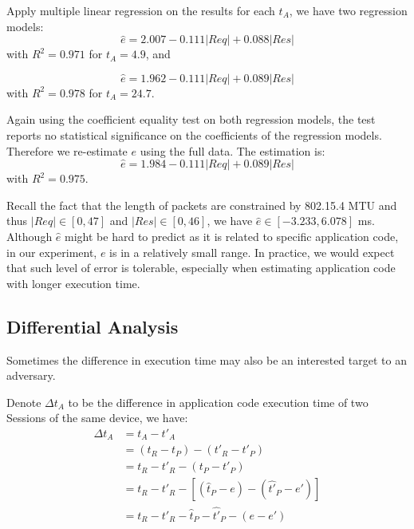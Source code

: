 Apply multiple linear regression on the results for each $t_A$, we have two regression models:
\begin{equation}
	\hat{e} = 2.007 - 0.111|Req| + 0.088|Res|
\end{equation}
with $R^2 = 0.971$ for $t_A = 4.9$, and

\begin{equation}
	\hat{e} = 1.962 - 0.111|Req| + 0.089|Res|
\end{equation}
with $R^2 = 0.978$ for $t_A = 24.7$.

Again using the coefficient equality test on both regression models, the test reports no statistical significance on the coefficients of the regression models. Therefore we re-estimate $e$ using the full data. The estimation is:
\begin{equation} \label{hate}
	\hat{e} = 1.984 - 0.111|Req| + 0.089|Res|
\end{equation}
with $R^2 = 0.975$.

Recall the fact that the length of packets are constrained by 802.15.4 MTU and thus $|Req| \in [0,47]$ and $|Res| \in [0,46]$, we have $\hat{e} \in [-3.233,6.078]$ ms. Although $\hat{e}$ might be hard to predict as it is related to specific application code, in our experiment, $e$ is in a relatively small range. In practice, we would expect that such level of error is tolerable, especially when estimating application code with longer execution time.

\subsection{Differential Analysis}

Sometimes the difference in execution time may also be an interested target to an adversary. 

Denote $\Delta t_A$ to be the difference in application code execution time of two Sessions of the same device, we have:
\begin{equation}\label{Eq: delta t}
	\begin{aligned}
		\Delta t_A &= t_A - t'_A \\
			&= (t_R - t_P) - (t'_R - t'_P) \\
			&= t_R - t'_R - (t_P - t'_P) \\
			&= t_R - t'_R - [(\hat{t}_P - e) - (\hat{t'}_P - e')] \\
			&= t_R - t'_R - \hat{t}_P - \hat{t'}_P - (e - e')
	\end{aligned}
\end{equation}
 
